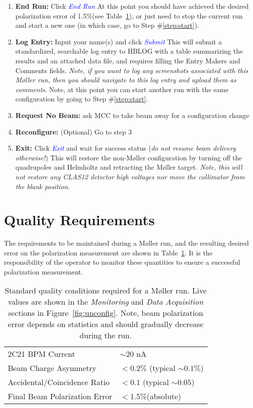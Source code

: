 \documentclass[amsmath,amssymb,notitlepage,12pt]{revtex4}
\newcommand{\ibeam}{20 nA\ }
\newcommand{\easy}{1.5\%}
\begin{document}
\begin{enumerate}
\item {\bf End Run:} Click \textcolor{blue}{\em End Run}
    \subitem At this point you should have achieved the desired polarization error of \easy (see Table~\ref{tab:reqs}), or just need to stop the current run and start a new one (in which case, go to Step \#\ref{step:start}).
\item {\bf Log Entry:} Input your name(s) and click \textcolor{blue}{\em Submit}
    \subitem This will submit a standardized, searchable log entry to HBLOG with a table summarizing the results and an attached data file, and requires filling the Entry Makers and Comments fields.  {\em Note, if you want to log any screenshots associated with this M{\o}ller run, then you should navigate to this log entry and upload them as comments}.
    \subitem Note, at this point you can start another run with the same configuration by going to Step \#\ref{step:start}.
\item {\bf Request No Beam:} ask MCC to take beam away for a configuration change
\item {\bf Reconfigure:} (Optional) Go to step 3
\item {\bf Exit:} Click \textcolor{blue}{\em Exit} and wait for success status ({\em do not resume beam delivery otherwise!})
    \subitem  This will restore the non-M{\o}ller configuration by turning off the quadrupoles and Helmholtz and retracting the M{\o}ller target.  {\em Note, this will not restore any CLAS12 detector high voltages nor move the collimator from the blank position}. 
\end{enumerate}

\section{Quality Requirements}\label{sec:quality}
The requirements to be maintained during a M{\o}ller run, and the resulting desired error on the polarization measurement are shown in Table~\ref{tab:reqs}.  It is the responsibility of the operator to monitor these quantities to ensure a successful polarization measurement.
\begin{table}[htbp]\centering
    \begin{tabular}{ll}\toprule[1.5pt]
        2C21 BPM Current & $\sim$\ibeam\\
        Beam Charge Asymmetry & $<0.2\%$ (typical $\sim 0.1\%$)\\
        Accidental/Coincidence Ratio & $<0.1$ (typical $\sim 0.05$)\\
        Final Beam Polarization Error & $<$\easy (absolute)\\
        \bottomrule[1.5pt]
    \end{tabular}
    \caption{Standard quality conditions required for a M{\o}ller run.  Live values are shown in the {\em Monitoring} and {\em Data Acquisition} sections in Figure~\ref{fig:unconfig}.  Note, beam polarization error depends on statistics and should gradually decrease during the run.\label{tab:reqs}}
\end{table}
\end{document}
